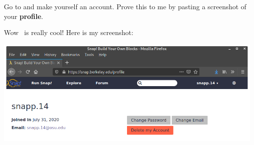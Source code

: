 \documentclass[nooutcomes,noauthor]{ximera}
\begin{document}
\begin{question}
  Go to \flavor and make yourself an account. Prove this to me by
  pasting a screenshot of your \textbf{profile}.
  \begin{freeResponse}
    Wow \snap\ is really cool! Here is my screenshot:
    \begin{center}
      \includegraphics[width=.4\textwidth]{profile.png}
    \end{center}
  \end{freeResponse}
\end{question}
\end{document}

